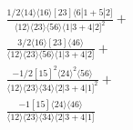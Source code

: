 \documentclass[varwidth, border=5pt]{standalone}
\begin{document}
\begin{my}
$\begin{gathered}
\scriptscriptstyle\frac{1/2⟨14⟩⟨16⟩[23]⟨6|1+5|2]}{⟨12⟩⟨23⟩⟨56⟩⟨1|3+4|2]^2}+\\
\scriptscriptstyle\frac{3/2⟨16⟩[23]⟨46⟩}{⟨12⟩⟨23⟩⟨56⟩⟨1|3+4|2]}+\\
\scriptscriptstyle\frac{-1/2[15]^2⟨24⟩^2⟨56⟩}{⟨12⟩⟨23⟩⟨34⟩⟨2|3+4|1]^2}+\\
\scriptscriptstyle\frac{-1[15]⟨24⟩⟨46⟩}{⟨12⟩⟨23⟩⟨34⟩⟨2|3+4|1]}\phantom{+}
\end{gathered}$
\end{my}
\end{document}
